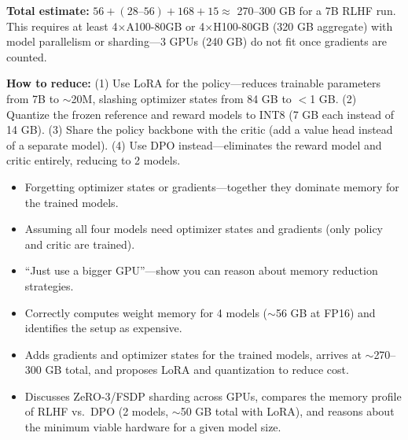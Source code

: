 \begin{interviewq}
\textbf{Total estimate:} $56 + (28\text{--}56) + 168 + 15 \approx$ 270--300 GB for a 7B RLHF run. This requires at least 4$\times$A100-80GB or 4$\times$H100-80GB (320 GB aggregate) with model parallelism or sharding---3 GPUs (240 GB) do not fit once gradients are counted.

\textbf{How to reduce:} (1) Use LoRA for the policy---reduces trainable parameters from 7B to $\sim$20M, slashing optimizer states from 84 GB to $<$1 GB. (2) Quantize the frozen reference and reward models to INT8 (7 GB each instead of 14 GB). (3) Share the policy backbone with the critic (add a value head instead of a separate model). (4) Use DPO instead---eliminates the reward model and critic entirely, reducing to 2 models.

\redflags
\begin{itemize}
    \item Forgetting optimizer states or gradients---together they dominate memory for the trained models.
    \item Assuming all four models need optimizer states and gradients (only policy and critic are trained).
    \item ``Just use a bigger GPU''---show you can reason about memory reduction strategies.
\end{itemize}


\goodgreat
\begin{itemize}
    \item {} Correctly computes weight memory for 4 models ($\sim$56 GB at FP16) and identifies the setup as expensive.
    \item {} Adds gradients and optimizer states for the trained models, arrives at $\sim$270--300 GB total, and proposes LoRA and quantization to reduce cost.
    \item {} Discusses ZeRO-3/FSDP sharding across GPUs, compares the memory profile of RLHF vs.\ DPO (2 models, $\sim$50 GB total with LoRA), and reasons about the minimum viable hardware for a given model size.
\end{itemize}

\end{interviewq}

